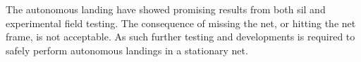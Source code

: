 The autonomous landing have showed promising results from both \gls{sil} and experimental field testing. The consequence of missing the net, or hitting the net frame, is not acceptable. As such further testing and developments is required to safely perform autonomous landings in a stationary net.








